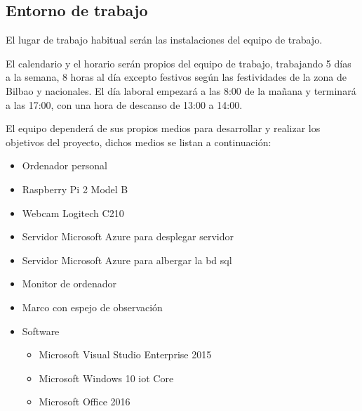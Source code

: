 \subsection{Entorno de trabajo}

El lugar de trabajo habitual serán las instalaciones del equipo de trabajo.

El calendario y el horario serán propios del equipo de trabajo, trabajando 5 días a la semana, 8 horas al día excepto festivos según las festividades de la zona de Bilbao y nacionales. El día laboral empezará a las 8:00 de la mañana y terminará a las 17:00, con una hora de descanso de 13:00 a 14:00.

El equipo dependerá de sus propios medios para desarrollar y realizar los objetivos del proyecto, dichos medios se listan a continuación:


\begin{itemize}
	\item Ordenador personal
	\item Raspberry Pi 2 Model B 
	\item Webcam Logitech C210
	\item Servidor Microsoft Azure para desplegar servidor
	\item Servidor Microsoft Azure para albergar la \acrshort{bd} \acrshort{sql}
	\item Monitor de ordenador
	\item Marco con espejo de observación
	\item Software
	\begin{itemize}
		\item Microsoft Visual Studio Enterprise 2015
		\item Microsoft Windows 10 \acrshort{iot} Core
		\item Microsoft Office 2016
	\end{itemize}
\end{itemize}
